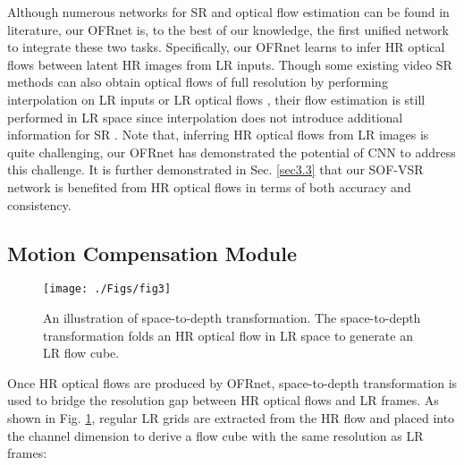 \documentclass[journal]{IEEEtran}
\begin{document}
	Although numerous networks for SR \cite{2016-RealTimeSingleImageandVideoSuperResolutionUsinganEfficientSubPixelConvolutionalNeuralNetwork-Shi-1874-1883,2017-DeepLaplacianPyramidNetworksforFastandAccurateSuperResolution-Lai-5835-5843,2018-DeepBackProjectionNetworksforSuperResolution-Haris--} and optical flow estimation \cite{2015-FlowNet:LearningOpticalFlowwithConvolutionalNetworks-Dosovitskiy-2758-2766,2017-PWCNet:CNNsforOpticalFlowUsingPyramidWarpingandCostVolume-Sun--,2018-LiteFlowNet:aLightweightConvolutionalNeuralNetworkforOpticalFlowEstimation-Hui--} can be found in literature, our OFRnet is, to the best of our knowledge, the first unified network to integrate these two tasks. Specifically, our OFRnet learns to infer HR optical flows between latent HR images from LR inputs. Though some existing video SR methods can also obtain optical flows of full resolution by performing interpolation on LR inputs \cite{2017-EndtoEndLearningofVideoSuperResolutionwithMotionCompensation-Makansi-203-214} or LR optical flows \cite{2018-FrameRecurrentVideoSuperResolution-Sajjadi-6626-6634}, their flow estimation is still performed in LR space since interpolation does not introduce additional information for SR \cite{2016-RealTimeSingleImageandVideoSuperResolutionUsinganEfficientSubPixelConvolutionalNeuralNetwork-Shi-1874-1883}. Note that, inferring HR optical flows from LR images is quite challenging, our OFRnet has demonstrated the potential of CNN to address this challenge. It is further demonstrated in Sec. \ref{sec3.3} that our SOF-VSR network is benefited from HR optical flows in terms of both accuracy and consistency.
	
	\subsection{Motion Compensation Module}
	
	\begin{figure}[bt]
		\centering
		\texttt{[image: ./Figs/fig3]}
		\caption{An illustration of space-to-depth transformation. The space-to-depth transformation folds an HR optical flow in LR space to generate an LR flow cube.}
		\label{fig3}
	\end{figure}
	
	Once HR optical flows are produced by OFRnet, space-to-depth transformation is used to bridge the resolution gap between HR optical flows and
	LR frames. As shown in Fig. \ref{fig3}, regular LR grids are extracted
	from the HR flow and placed into the channel dimension to derive
	a flow cube with the same resolution as LR frames:
	
\end{document}
